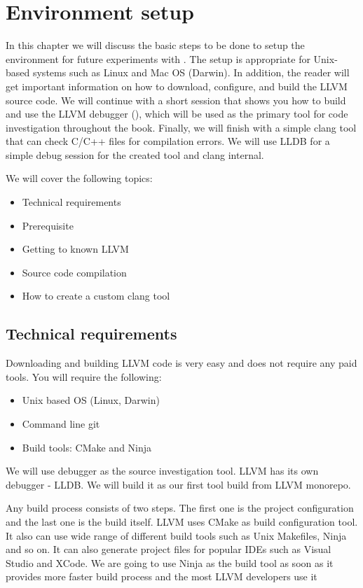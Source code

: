 \chapter{\textbf{Environment setup}}
\pagestyle{fancy}
\fancyhf{}
\rhead{\thepage}

In this chapter we will discuss the basic steps to be done to setup the
environment for 
future experiments with \clang. The setup is appropriate for Unix-based systems
such as Linux and Mac OS (Darwin). In addition, the reader will get important
information on how to download, configure, and build the LLVM source code. We
will continue with a short session that shows you how to build and use the LLVM
debugger (\lldb), which will be used as the primary tool for code investigation
throughout the book. Finally, we will finish with a simple clang tool that can
check C/C++ files for compilation errors. We will use LLDB for a simple debug
session for the created tool and clang internal. 

We will cover the following topics:
\begin{itemize}
\item Technical requirements
\item Prerequisite
\item Getting to known LLVM
\item Source code compilation
\item How to create a custom clang tool
\end{itemize}

\section{Technical requirements}
Downloading and building LLVM code is very easy and does not require any paid tools.
You will require the following: 
\begin{itemize}
\item Unix based OS (Linux, Darwin)
\item Command line git  
\item Build tools: CMake and Ninja
\end{itemize}
We will use debugger as the source investigation tool. LLVM has its own debugger
- LLDB. We will build it as our first tool build from LLVM monorepo.

Any build process consists of two steps. The first one is the project
configuration and the last one is the build itself. LLVM uses CMake as build
configuration tool. It also can use wide range of different build tools such as
Unix Makefiles, Ninja and so on. It can also generate project files for popular IDEs such
as Visual Studio and XCode. We are going to use Ninja as the build tool as soon
as it provides more faster build process and the most LLVM developers use it
\citep{llvm:getstarted}   

